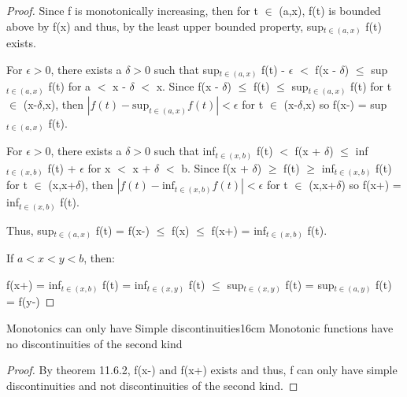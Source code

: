     \begin{proof}
        \small
        Since f is monotonically increasing, then for t $\in$ (a,x),
        f(t) is bounded above by f(x) and thus, by the least upper bounded
        property, sup$_{t \in (a,x)}$ f(t) exists.

        For $\epsilon > 0$, there exists a $\delta > 0$ such that
        sup$_{t \in (a,x)}$ f(t) - $\epsilon$
        $<$ f(x - $\delta$)
        $\leq$ sup$_{t \in (a,x)}$ f(t)
        for a $<$ x - $\delta$ $<$ x.
        Since f(x - $\delta$) $\leq$ f(t) $\leq$ sup$_{t \in (a,x)}$ f(t)
        for t $\in$ (x-$\delta$,x), then
        $|f(t) - \text{sup}_{t \in (a,x)} f(t)| < \epsilon$ for
        t $\in$ (x-$\delta$,x) so f(x-) = sup$_{t \in (a,x)}$ f(t).

        For $\epsilon > 0$, there exists a $\delta > 0$ such that
        inf$_{t \in (x,b)}$ f(t)
        $<$ f(x + $\delta$)
        $\leq$ inf$_{t \in (x,b)}$ f(t) + $\epsilon$
        for x $<$ x + $\delta$ $<$ b.
        Since f(x + $\delta$) $\geq$ f(t) $\geq$ inf$_{t \in (x,b)}$ f(t)
        for t $\in$ (x,x+$\delta$), then
        $|f(t) - \text{inf}_{t \in (x,b)} f(t)| < \epsilon$ for
        t $\in$ (x,x+$\delta$) so f(x+) = inf$_{t \in (x,b)}$ f(t).

        Thus,
        sup$_{t \in (a,x)}$ f(t) = f(x-)
        $\leq$ f(x)
        $\leq$ f(x+) = inf$_{t \in (x,b)}$ f(t).

        If $a < x < y < b$, then:

        \hspace{1cm}
        f(x+) = inf$_{t \in (x,b)}$ f(t)
        = inf$_{t \in (x,y)}$ f(t)
        $\leq$ sup$_{t \in (x,y)}$ f(t)
        = sup$_{t \in (a,y)}$ f(t)
        = f(y-)
    \end{proof}

    \newpage



    \begin{corollary}{Monotonics can only have Simple discontinuities}{16cm}
        Monotonic functions have no discontinuities of the second kind
    \end{corollary}

    \begin{proof}
        By {\color{red} theorem 11.6.2}, f(x-) and f(x+) exists and thus,
        f can only have simple discontinuities and not discontinuities
        of the second kind.
    \end{proof}

    \vspace{0.5cm}



